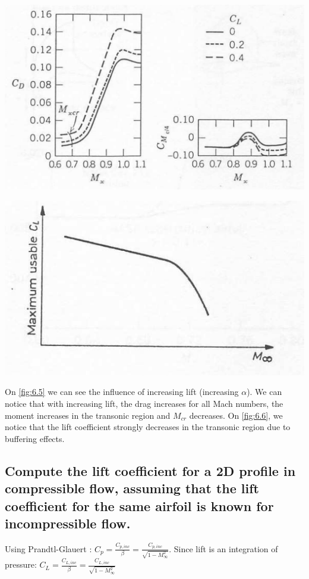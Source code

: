 \documentclass[british,french,11pt, a4paper, openany]{article}
\begin{document}
\begin{center}
	\begin{minipage}{0.4\textwidth}
		\includegraphics[scale=0.15]{ch6/5}
		\label{fig:6.5}
	\end{minipage}
	\begin{minipage}{0.4\textwidth}
		\includegraphics[scale=0.4]{ch6/6}
		\label{fig:6.6}
	\end{minipage}
\end{center}

On \autoref{fig:6.5} we can see the influence of increasing lift (increasing $\alpha$). We can notice that with increasing lift, the drag increases for all Mach numbers, the moment increases in the transonic region and $M_{cr}$ decreases. On \autoref{fig:6.6}, we notice that the lift coefficient strongly decreases in the transonic region due to buffering effects. 


\subsection{Compute the lift coefficient for a 2D profile in compressible flow, assuming that the lift coefficient for the same airfoil is known for incompressible flow.}
Using Prandtl-Glauert : $C_p = \frac{C_{p,inc}}{\beta} = \frac{C_{p,inc}}{\sqrt{1 - M_\infty ^2}}$. Since lift is an integration of pressure: $C_L = \frac{C_{L,inc}}{\beta} = \frac{C_{L,inc}}{\sqrt{1 - M_\infty ^2}}$
\end{document}

